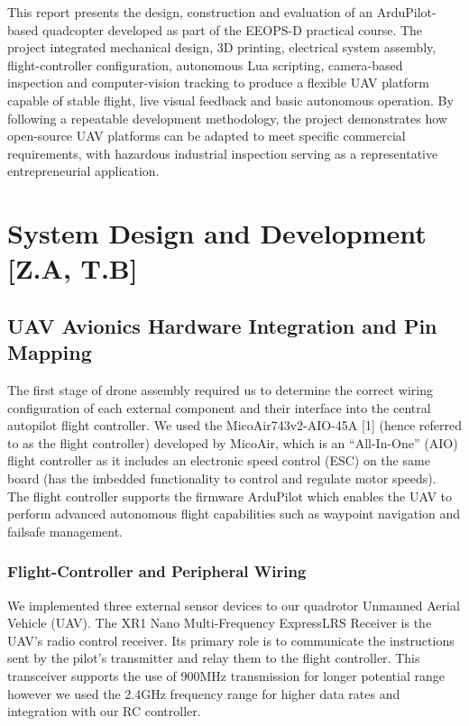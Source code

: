 \documentclass[conference]{IEEEtran}
\begin{document}
This report presents the design, construction and evaluation of an ArduPilot-based quadcopter developed as part of the EEOPS-D practical course. The project integrated mechanical design, 3D printing, electrical system assembly, flight-controller configuration, autonomous Lua scripting, camera-based inspection and computer-vision tracking to produce a flexible UAV platform capable of stable flight, live visual feedback and basic autonomous operation. By following a repeatable development methodology, the project demonstrates how open-source UAV platforms can be adapted to meet specific commercial requirements, with hazardous industrial inspection serving as a representative entrepreneurial application.
\maketitle

\section{System Design and Development [Z.A, T.B]}

\subsection*{UAV Avionics Hardware Integration and Pin Mapping}


The first stage of drone assembly required us to determine the correct wiring configuration of each external component and their interface into the central autopilot flight controller. We used the MicoAir743v2-AIO-45A [1] (hence referred to as the flight controller) developed by MicoAir, which is an “All-In-One” (AIO) flight controller as it includes an electronic speed control (ESC) on the same board (has the imbedded functionality to control and regulate motor speeds). The flight controller supports the firmware ArduPilot which enables the UAV to perform advanced autonomous flight capabilities such as waypoint navigation and failsafe management.  

\subsubsection*{Flight-Controller and Peripheral Wiring}

We implemented three external sensor devices to our quadrotor Unmanned Aerial Vehicle (UAV). The XR1 Nano Multi-Frequency ExpressLRS Receiver is the UAV’s radio control receiver. Its primary role is to communicate the instructions sent by the pilot’s transmitter and relay them to the flight controller. This transceiver supports the use of 900MHz transmission for longer potential range however we used the 2.4GHz frequency range for higher data rates and integration with our RC controller.  
\end{document}
